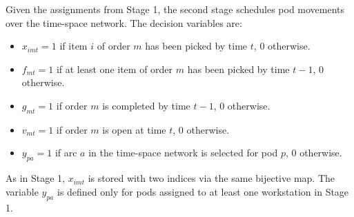 \documentclass[a4paper,10pt]{article}
\begin{document}
Given the assignments from Stage 1, the second stage schedules pod movements over the time-space network. The decision variables are:
\begin{itemize}[noitemsep]
    \item $x_{imt} = 1$ if item $i$ of order $m$ has been picked by time $t$,
          $0$ otherwise.
    \item $f_{mt} = 1$ if at least one item of order $m$ has been picked by time
          $t-1$, $0$ otherwise.
    \item $g_{mt} = 1$ if order $m$ is completed by time $t-1$, $0$ otherwise.
    \item $v_{mt} = 1$ if order $m$ is open at time $t$, $0$ otherwise.
    \item $y_{pa} = 1$ if arc $a$ in the time-space network is selected for pod
          $p$, $0$ otherwise.
\end{itemize}

As in Stage 1, $x_{imt}$ is stored with two indices via the same bijective map.
The variable $y_{pa}$ is defined only for pods assigned to at least one workstation in Stage 1.
\end{document}
